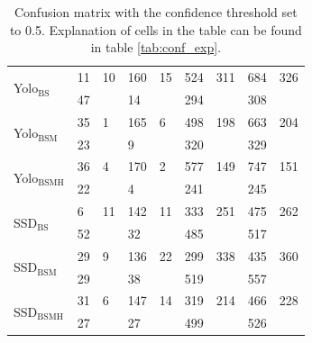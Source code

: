 \begin{table}[h!]
\begin{tabular}{l|ll|ll|ll|ll}
                       \hline
\multirow{2}{*}{Yolo$_{\text{BS}}$} & 11            & 10           & 160            & 15            & 524            & 311            & 684              & 326             \\
                       & 47            &              & 14             &               & 294            &                & 308              &                 \\ \hline
\multirow{2}{*}{Yolo$_{\text{BSM}}$} & 35            & 1            & 165            & 6             & 498            & 198            & 663              & 204             \\
                       & 23            &              & 9              &               & 320            &                & 329              &                 \\ \hline
\multirow{2}{*}{Yolo$_{\text{BSMH}}$} & 36            & 4            & 170            & 2             & 577            & 149            & 747              & 151             \\
                       & 22            &              & 4              &               & 241            &                & 245              &                 \\ \hline
\multirow{2}{*}{SSD$_{\text{BS}}$}  & 6             & 11           & 142            & 11            & 333            & 251            & 475              & 262             \\
                       & 52            &              & 32             &               & 485            &                & 517              &                 \\ \hline
\multirow{2}{*}{SSD$_{\text{BSM}}$}  & 29            & 9            & 136            & 22            & 299            & 338            & 435              & 360             \\
                       & 29            &              & 38             &               & 519            &                & 557              &                 \\ \hline
\multirow{2}{*}{SSD$_{\text{BSMH}}$}  & 31            & 6            & 147            & 14            & 319            & 214            & 466              & 228             \\
                       & 27            &              & 27             &               & 499            &                & 526              &                
\end{tabular}
\caption{Confusion matrix with the confidence threshold set to 0.5. Explanation of cells in the table can be found in table \ref{tab:conf_exp}.}
\label{tab:conf_05}
\end{table}

